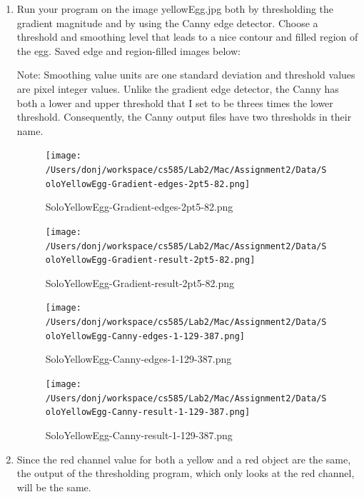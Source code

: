 \documentclass{article}
\begin{document}
\begin{enumerate}

\item
Run your program on the image yellowEgg.jpg both by thresholding the gradient magnitude and by using the Canny edge detector. Choose a threshold and smoothing level that leads to a nice contour and filled region of the egg. Saved edge and region-filled images below:

Note: Smoothing value units are one standard deviation and threshold values are pixel integer values. Unlike the gradient edge detector, the Canny has both a lower and upper threshold that I set to be threes times the lower threshold. Consequently, the Canny output files have two thresholds in their name.

\begin{figure}[ht!]
\centering
\texttt{[image: /Users/donj/workspace/cs585/Lab2/Mac/Assignment2/Data/SoloYellowEgg-Gradient-edges-2pt5-82.png]}
\caption{SoloYellowEgg-Gradient-edges-2pt5-82.png}
\label{overflow}
\end{figure}

\begin{figure}[ht!]
\centering
\texttt{[image: /Users/donj/workspace/cs585/Lab2/Mac/Assignment2/Data/SoloYellowEgg-Gradient-result-2pt5-82.png]}
\caption{SoloYellowEgg-Gradient-result-2pt5-82.png}
\label{overflow}
\end{figure}

\begin{figure}[ht!]
\centering
\texttt{[image: /Users/donj/workspace/cs585/Lab2/Mac/Assignment2/Data/SoloYellowEgg-Canny-edges-1-129-387.png]}
\caption{SoloYellowEgg-Canny-edges-1-129-387.png}
\label{overflow}
\end{figure}

\begin{figure}[ht!]
\centering
\texttt{[image: /Users/donj/workspace/cs585/Lab2/Mac/Assignment2/Data/SoloYellowEgg-Canny-result-1-129-387.png]}
\caption{SoloYellowEgg-Canny-result-1-129-387.png}
\label{overflow}
\end{figure}












\item
Since the red channel value for both a yellow and a red object are the same, the output of the thresholding program, which only looks at the red channel, will be the same.


\end{enumerate}
\end{document}

